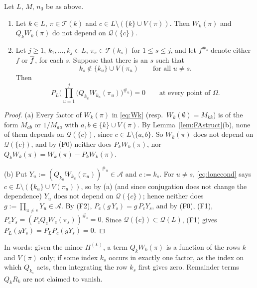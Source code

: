 \begin{lemma}\label{lem:FAvanish}
Let $L$, $M$, $n_0$ be as above.
\begin{enumerate}[label=\textup{(\alph*)},leftmargin=2.2em,itemsep=1pt]
\item Let $k\in L$, $\pi\in\mathcal T(k)$ and $c\in L\setminus(\{k\}\cup V(\pi))$. Then $W_k(\pi)$ and $Q_kW_k(\pi)$ do not depend on $\mathcal Q(\{c\})$.
\item Let $j\ge1$, $k_1,\dots,k_j\in L$, $\pi_s\in\mathcal T(k_s)$ for $1\le s\le j$, and let $f^{\#_s}$ denote either $f$ or $\overline{f}$, for each $s$. Suppose that there is an $s$ such that
\begin{equation}\label{eq:lonecond}
 k_s\notin\{k_u\}\cup V(\pi_u)\qquad\text{for all }u\ne s .
\end{equation}
Then
\[
 P_L\Big(\prod_{u=1}^j\big(Q_{k_u}W_{k_u}(\pi_u)\big)^{\#_u}\Big)=0\qquad\text{at every point of }\Omega .
\]
\end{enumerate}
\end{lemma}
\begin{proof}
(a) Every factor of $W_k(\pi)$ in \eqref{eq:Wk} (resp.\ $W_k(\emptyset)=M_{kk}$) is of the form $M_{ab}$ or $1/M_{aa}$ with $a,b\in\{k\}\cup V(\pi)$. By Lemma~\ref{lem:FAstruct}(b), none of them depends on $\mathcal Q(\{c\})$, since $c\in L\setminus\{a,b\}$.
So $W_k(\pi)$ does not depend on $\mathcal Q(\{c\})$, and by (F0) neither does $P_kW_k(\pi)$, nor $Q_kW_k(\pi)=W_k(\pi)-P_kW_k(\pi)$.

(b) Put $Y_u:=(Q_{k_u}W_{k_u}(\pi_u))^{\#_u}\in\mathcal A$ and $c:=k_s$. For $u\ne s$, \eqref{eq:lonecond} says $c\in L\setminus(\{k_u\}\cup V(\pi_u))$, so by (a) (and since conjugation does not change the dependence) $Y_u$ does not depend on $\mathcal Q(\{c\})$; hence neither does $g:=\prod_{u\ne s}Y_u\in\mathcal A$.
By (F2), $P_c(g\,Y_s)=g\,P_cY_s$, and by (F0), (F1), $P_cY_s=(P_cQ_cW_c(\pi_s))^{\#_s}=0$. Since $\mathcal Q(\{c\})\subset\mathcal Q(L)$, (F1) gives $P_L(gY_s)=P_LP_c(gY_s)=0$.
\end{proof}
\noindent In words: given the minor $H^{(L)}$, a term $Q_kW_k(\pi)$ is a function of the rows $k$ and $V(\pi)$ only; if some index $k_s$ occurs in exactly one factor, as the index on which $Q_{k_s}$ acts, then integrating the row $k_s$ first gives zero. Remainder terms $Q_kR_k$ are not claimed to vanish.

